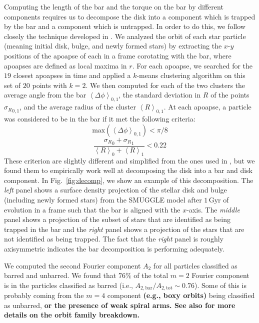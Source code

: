 \documentclass[twocolumn,linenumbers,trackchanges]{aastex631}
\newcommand{\SMUGGLE}{SMUGGLE}
\begin{document}
Computing the length of the bar and the torque on the bar by different
components requires us to decompose the disk into a component which is trapped
by the bar and a component which is untrapped. In order to do this, we follow
closely the technique developed in \citet{2016MNRAS.463.1952P}. We analyzed the
orbit of each star particle (meaning initial disk, bulge, and newly formed
stars) by extracting the $x$-$y$ positions of the apoapse of each in a frame
corotating with the bar, where apoapses are defined as local maxima in $r$. For
each apoapse, we searched for the $19$ closest apoapses in time and applied a
$k$-means clustering algorithm on this set of $20$ points with $k=2$. We then
computed for each of the two clusters the average angle from the bar
$\left<\Delta \phi\right>_{0,1}$, the standard deviation in $R$ of the points
${\sigma_R}_{0,1}$, and the average radius of the cluster
$\left<R\right>_{0,1}$. At each apoapse, a particle was considered to be in the
bar if it met the following criteria:
\begin{equation}
\textrm{max}\left(\left<\Delta \phi\right>_{0,1}\right) < \pi / 8
\end{equation}
\begin{equation}
\frac{{\sigma_R}_0 + {\sigma_R}_1}{\left<R\right>_0 + \left<R\right>_1} < 0.22
\end{equation}
These criterion are slightly different and simplified from the ones used in
\citet{2016MNRAS.463.1952P}, but we found them to empirically work well at
decomposing the disk into a bar and disk component. In Fig.~\ref{fig:decomp}, we
show an example of this decomposition. The \textit{left} panel shows a surface
density projection of the stellar disk and bulge (including newly formed stars)
from the \SMUGGLE{} model after $1\,\text{Gyr}$ of evolution in a frame such that
the bar is aligned with the $x$-axis. The \textit{middle} panel shows a
projection of the subset of stars that are identified as being trapped in the
bar and the \textit{right} panel shows a projection of the stars that are not
identified as being trapped. The fact that the \textit{right} panel is roughly
axisymmetric indicates the bar decomposition is performing adequately.

We computed the second Fourier component $A_2$ for all particles classified as
barred and unbarred. We found that $76\%$ of the total $m=2$ Fourier component
is in the particles classified as barred (i.e.,
$A_{2,\textrm{bar}}/A_{2,\textrm{tot}}\sim0.76$). Some of this is probably
coming from the $m=4$ component {\bf (e.g., boxy orbits)} being classified as
unbarred, {\bf or the presence of weak spiral arms. See also
\citet{2021MNRAS.500..838P} for more details on the orbit family breakdown.}
\end{document}
